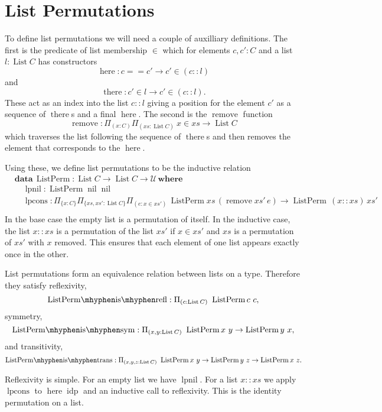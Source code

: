 \documentclass[12pt, parskip, DIV=14]{scrbook}
\newcommand{\idp}{\operatorname{idp}}
\newcommand{\List}{\operatorname{List}}
\newcommand{\here}{\operatorname{here}}
\newcommand{\there}{\operatorname{there}}
\newcommand{\ListPerm}{\operatorname{ListPerm}}
\newcommand{\remove}{\operatorname{remove}}
\newcommand{\lpnil}{\operatorname{lpnil}}
\newcommand{\lpcons}{\operatorname{lpcons}}
\newcommand{\nil}{\operatorname{nil}}
\begin{document}
\section{List Permutations}

To define list permutations we will need a couple of auxilliary definitions. The first is the predicate of list membership $\in$ which for elements $c , c' : C$ and a list $l : \List C$ has constructors
$$\here : c == c' \to c' \in (c :: l)$$
and
$$\there : c' \in l \to c' \in (c :: l).$$
These act as an index into the list $c :: l$ giving a position for the element $c'$ as a sequence of $\there$s and a final $\here$. The second is the $\remove$ function
$$\remove : \Pi_{(x : C)}\Pi_{(xs : \List C)}~x \in xs \to \List C$$
which traverses the list following the sequence of $\there$s and then removes the element that corresponds to the $\here$.

Using these, we define list permutations to be the inductive relation
\begin{align*}
&\mathbf{data}\,\ListPerm : \List C \to \List C \to \mathcal{U}\,\mathbf{where} \\
  &\quad\lpnil : \ListPerm \nil \nil \\
  &\quad\lpcons : \Pi_{\{x : C\}}\Pi_{\{xs , xs' : \List C\}}\Pi_{(e : x \in xs')}\,\ListPerm xs\,(\remove xs'\,e) \to \ListPerm\,(x :: xs)\,xs' \\
\end{align*}
In the base case the empty list is a permutation of itself. In the inductive case, the list $x :: xs$ is a permutation of the list $xs'$ if $x \in xs'$ and $xs$ is a permutation of $xs'$ with $x$ removed. This ensures that each element of one list appears exactly once in the other.

List permutations form an equivalence relation between lists on a type. Therefore they satisfy reflexivity,
$$\mathrm{ListPerm\mhyphen is\mhyphen refl} : \Pi_{(c : \List C)}~\ListPerm c~c,$$
symmetry,
$$\mathrm{ListPerm\mhyphen is\mhyphen sym} : \Pi_{(x , y : \List C)}~\ListPerm x~y \to \ListPerm y~x,$$
and transitivity,
$$\mathrm{ListPerm\mhyphen is\mhyphen trans} : \Pi_{(x , y , z : \List C)}~\ListPerm x~y \to \ListPerm y~z \to \ListPerm x~z.$$

Reflexivity is simple. For an empty list we have $\lpnil$. For a list $x :: xs$ we apply $\lpcons$ to $\here \idp$ and an inductive call to reflexivity. This is the identity permutation on a list.
\end{document}
